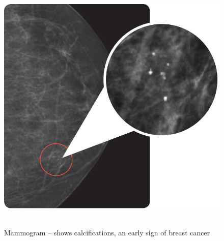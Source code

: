 \begin{figure}[!hbt]
\centering
\includegraphics[width=15cm]{images/calcifications}~\\
\caption{\label{fig:frog}Mammogram – shows calcifications, an early sign of breast cancer
}
\end{figure}